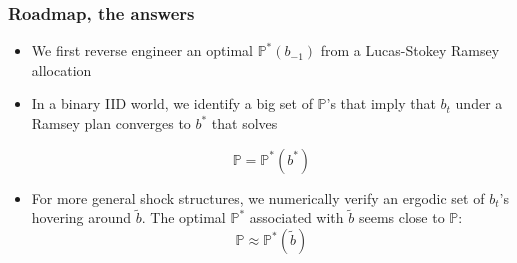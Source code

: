 \documentclass{beamer}
\begin{document}
\begin{frame}
\frametitle{Roadmap, the answers}


	
	\begin{itemize}
	\item We first reverse engineer an optimal $\mathbb{P}^*(b_{-1})$ from a Lucas-Stokey  Ramsey allocation
	
	 \item In a binary IID world, we identify a big set of  $\mathbb{P}$'s that imply that $b_t$  under a Ramsey plan converges to $b^*$ that solves
	
	\[\mathbb{P}=\mathbb{P}^*(b^*)\]
	
	
	\item For more general shock structures, we numerically verify  an ergodic set of $b_t$'s
 hovering around $\tilde b$.    The optimal $\mathbb{P}^*$ associated with $\tilde b$ seems close to $\mathbb{P}$:
	\[\mathbb{P}\approx \mathbb{P}^*(\tilde b)\]
	\end{itemize}

	
\end{frame}
%
%
\end{document}
